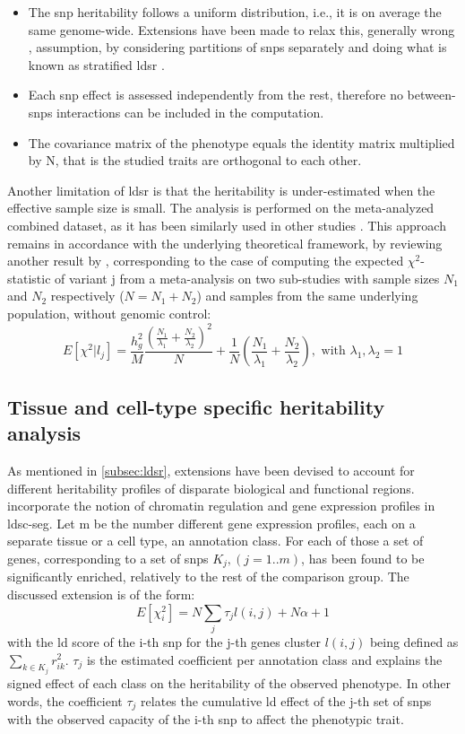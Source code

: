 \begin{itemize}
	\item{The \ac{snp} heritability follows a uniform distribution, i.e., it is on average the same genome-wide. Extensions have been made to relax this, generally wrong \cite{Trynka2013}, assumption, by considering partitions of \acp{snp} separately and doing what is known as stratified \ac{ldsr} \cite{Finucane2015,Finucane2018}.}
	\item{Each \ac{snp} effect is assessed independently from the rest, therefore no between-\acp{snp} interactions can be included in the computation.}
	\item{The covariance matrix of the phenotype equals the identity matrix multiplied by N, that is the studied traits are orthogonal to each other.}
\end{itemize}
Another limitation of \ac{ldsr} is that the heritability is under-estimated when the effective sample size is small\cite{Lee2018}. The analysis is performed on the meta-analyzed combined dataset, as it has been similarly used in other studies \cite{Gialluisi2020,Levey2021}. This approach remains in accordance with the underlying theoretical framework, by reviewing another result by \citet{Bulik-Sullivan2015}, corresponding to the case of computing the expected $\chi^2$-statistic of variant j from a meta-analysis on two sub-studies with sample sizes $N_1$ and $N_2$ respectively ($N=N_1+N_2$) and samples from the same underlying population, without genomic control:
$$
E\left[\chi^2|l_j\right] = \frac{h_g^2}{M} \frac{(\frac{N_1}{\lambda_1} + \frac{N_2}{\lambda_2})^2}{N} + \frac{1}{N}\left(\frac{N_1}{\lambda_1} + \frac{N_2}{\lambda_2}\right) , \text{ with } \lambda_1,\lambda_2=1
$$


\subsection{Tissue and cell-type specific heritability analysis}
As mentioned in \autoref{subsec:ldsr}, extensions have been devised to account for different heritability profiles of disparate biological and functional regions. \citet{Finucane2018} incorporate the notion of chromatin regulation and gene expression profiles in \ac{ldsc-seg}. Let m be the number different gene expression profiles, each on a separate tissue or a cell type, an annotation class. For each of those a set of genes, corresponding to a set of \acp{snp} $K_j,(j=1..m)$, has been found to be significantly enriched, relatively to the rest of the comparison group. The discussed extension is of the form:
$$
E\left[\chi^2_i\right]= N \sum_j{\tau_j l(i,j)} + N \alpha + 1
$$
with the \ac{ld} score of the i-th \ac{snp} for the j-th genes cluster $l(i,j)$ being defined as $\sum_{k \in K_j} r^2_{ik}$. $\tau_j$ is the estimated coefficient per annotation class and explains the signed effect of each class on the heritability of the observed phenotype. In other words, the coefficient $\tau_j$ relates the cumulative \ac{ld} effect of the j-th set of \acp{snp} with the observed capacity of the i-th \ac{snp} to affect the phenotypic trait. 

